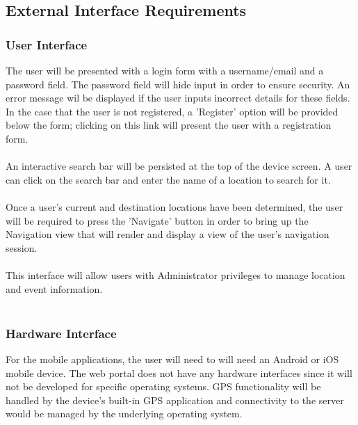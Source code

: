 \subsection{External Interface Requirements}
    \subsubsection{User Interface}
    
            The user will be presented with a login form with a username/email and a password field. The password field will hide input in order to ensure security. An error message wil be displayed if the user inputs incorrect details for these fields. In the case that the user is not registered, a 'Register' option will be provided below the form; clicking on this link will present the user with a registration form.
    \\  \\
            An interactive search bar will be persisted at the top of the device screen. A user can click on the search bar and enter the name of a location to search for it.
    \\  \\
            Once a user's current and destination locations have been determined, the user will be required to press the 'Navigate' button in order to bring up the Navigation view that will render and display a view of the user's navigation session. 
    \\  \\
            This interface will allow users with Administrator privileges to manage location and event information.
    \\  \\
    \subsubsection{Hardware Interface}
        For the mobile applications, the user will need to will need an Android or iOS mobile device. The web portal does not have any hardware interfaces since it will not be developed for specific operating systems. GPS functionality will be handled by the device's built-in GPS application and connectivity to the server would be managed by the underlying operating system.
        
